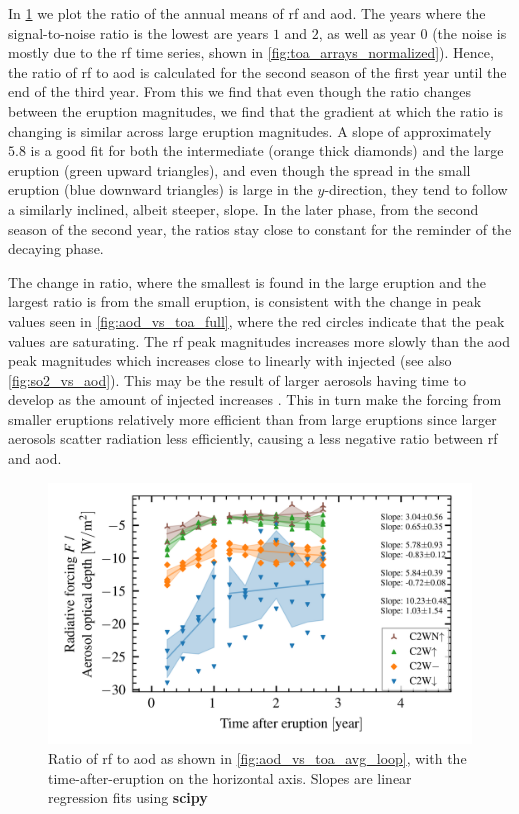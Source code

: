 \documentclass{ametsocV5}
\begin{document}
In \cref{fig:aod_vs_toa_avg_loop_ratio} we plot the ratio of the annual means of \ac{rf}
and \ac{aod}. The years where the signal-to-noise ratio is the lowest are years \(1\)
and \(2\), as well as year \(0\) (the noise is mostly due to the \ac{rf} time series,
shown in \cref{fig:toa_arrays_normalized}). Hence, the ratio of \ac{rf} to \ac{aod} is
calculated for the second season of the first year until the end of the third year. From
this we find that even though the ratio changes between the eruption magnitudes, we find
that the gradient at which the ratio is changing is similar across large eruption
magnitudes. A slope of approximately \(5.8\) is a good fit for both the intermediate
(orange thick diamonds) and the large eruption (green upward triangles), and even though
the spread in the small eruption (blue downward triangles) is large in the
\(y\)-direction, they tend to follow a similarly inclined, albeit steeper, slope. In the
later phase, from the second season of the second year, the ratios stay close to
constant for the reminder of the decaying phase.

The change in ratio, where the smallest is found in the large eruption and the largest
ratio is from the small eruption, is consistent with the change in peak values seen in
\cref{fig:aod_vs_toa_full}, where the red circles indicate that the peak values are
saturating. The \ac{rf} peak magnitudes increases more slowly than the \ac{aod} peak
magnitudes which increases close to linearly with injected  (see also
\cref{fig:so2_vs_aod}). This may be the result of larger aerosols having time to develop
as the amount of injected  increases \citep{niemeier2015,marshall2019}. This in
turn make the forcing from smaller eruptions relatively more efficient than from large
eruptions since larger aerosols scatter radiation less efficiently, causing a less
negative ratio between \ac{rf} and \ac{aod}.

\begin{figure}[t]
  \begin{center}
    \includegraphics[width=0.95\linewidth]{figures/aod_vs_toa_avg_loop_ratio.png}
  \end{center}
  \caption{
    Ratio of \ac{rf} to \ac{aod} as shown in
    \cref{fig:aod_vs_toa_avg_loop}, with the time-after-eruption on the horizontal axis.
    Slopes are linear regression fits using \textbf{scipy}
  }%
  \label{fig:aod_vs_toa_avg_loop_ratio}
\end{figure}
\end{document}
